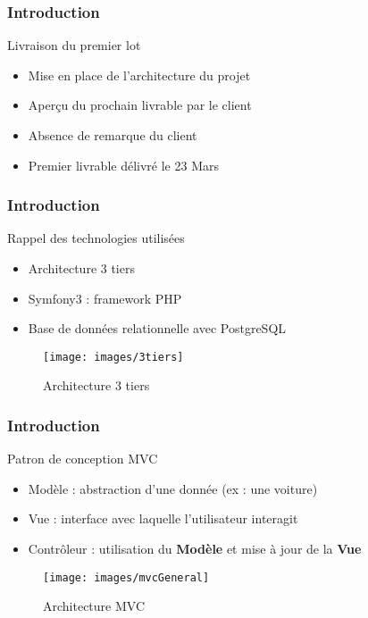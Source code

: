 
\speaker{\Kafui}
\begin{frame}
  \frametitle{Introduction}
  \begin{block}{Livraison du premier lot}
  \begin{itemize}
	\item Mise en place de l'architecture du projet
	\item Aperçu du prochain livrable par le client
	\item Absence de remarque du client
	\item Premier livrable délivré le 23 Mars
  \end{itemize}
  \end{block}
\end{frame}

\begin{frame}
  \frametitle{Introduction}
  \begin{block}{Rappel des technologies utilisées}
  \begin{itemize}
	\item Architecture 3 tiers
	\item Symfony3 : framework PHP 
	\item Base de données relationnelle avec PostgreSQL
  \end{itemize}

  \begin{figure}[!h]
	\begin{center}
	\texttt{[image: images/3tiers]}
	\caption{Architecture 3 tiers}
	\end{center}
  \end{figure}
  \end{block}
\end{frame}

\begin{frame}
  \frametitle{Introduction}
  \begin{block}{Patron de conception MVC}
  \begin{itemize}
	\item Modèle : abstraction d'une donnée (ex : une voiture)
	\item Vue : interface avec laquelle l'utilisateur interagit
	\item Contrôleur : utilisation du \textbf{Modèle} et mise à jour de la \textbf{Vue}
	
  \end{itemize}

\begin{figure}[!h]
	\begin{center}
	\texttt{[image: images/mvcGeneral]}
	\caption{Architecture MVC}
	\end{center}
\end{figure}
\end{block}
\end{frame}

